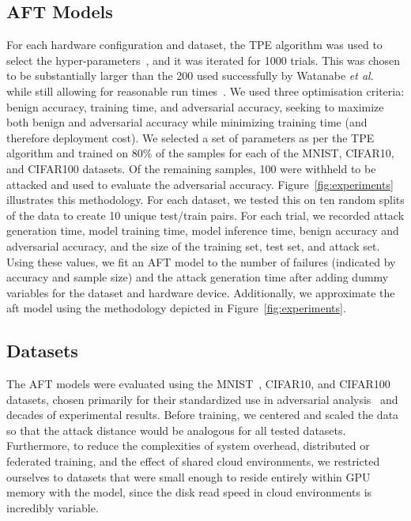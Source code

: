 \documentclass[conference]{IEEEtran}
\begin{document}
\subsection{AFT Models}

For each hardware configuration and dataset, the TPE algorithm was used to select the hyper-parameters~\cite{ozaki2020multiobjective,zitzler2008quality}, and it was iterated for 1000 trials. This was chosen to be substantially larger than the 200 used successfully by Watanabe \textit{et al.}~\cite{tpe_params} while still allowing for reasonable run times~\cite{legriel2010approximating}. 
We used three optimisation criteria: benign accuracy, training time, and adversarial accuracy, seeking to maximize both benign and adversarial accuracy while minimizing training time (and therefore deployment cost). We selected a set of parameters as per the TPE algorithm and trained on 80\% of the samples for each of the MNIST, CIFAR10, and CIFAR100 datasets. Of the remaining samples, 100 were withheld to be attacked and used to evaluate the adversarial accuracy. Figure~\ref{fig:experiments} illustrates this methodology. For each dataset, we tested this on ten random splits of the data to create 10 unique test/train pairs. For each trial, we recorded attack generation time, model training time, model inference time, benign accuracy and adversarial accuracy, and the size of the training set, test set, and attack set. Using these values, we fit an AFT model to the number of failures (indicated by accuracy and sample size) and the attack generation time after adding dummy variables for the dataset and hardware device. Additionally, we approximate the \acrshort{aft} model using the methodology depicted in Figure~\ref{fig:experiments}.


\subsection{Datasets}

The AFT models were evaluated using the MNIST~\cite{mnist}, CIFAR10\cite{cifar}, and CIFAR100\cite{cifar} datasets, chosen primarily for their standardized use in adversarial analysis~\cite{madry2017towards,croce_reliable_2020,carlini_towards_2017,deepfool} and decades of experimental results.
Before training, we centered and scaled the data so that the attack distance would be analogous for all tested datasets. Furthermore, to reduce the complexities of system overhead, distributed or federated training, and the effect of shared cloud environments, we restricted ourselves to datasets that were small enough to reside entirely within GPU memory with the model, since the disk read speed in cloud environments is incredibly variable.
\end{document}
